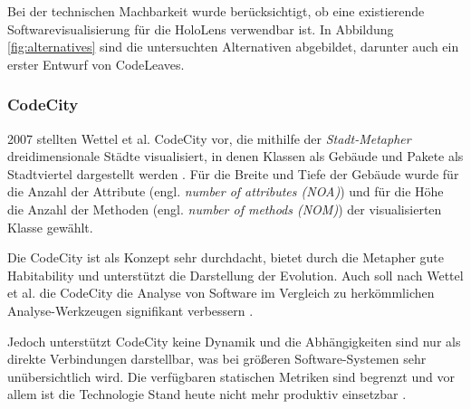 Bei der technischen Machbarkeit wurde berücksichtigt, ob eine existierende Softwarevisualisierung für die HoloLens verwendbar ist. In Abbildung \ref{fig:alternatives} sind die untersuchten Alternativen abgebildet, darunter auch ein erster Entwurf von CodeLeaves.

\subsubsection*{CodeCity}
2007 stellten Wettel et al. CodeCity vor, die mithilfe der \textit{Stadt-Metapher} dreidimensionale Städte visualisiert, in denen Klassen als Gebäude und Pakete als Stadtviertel dargestellt werden \cite{wettel2007program, wettel2008visual, wettel2011software}. Für die Breite und Tiefe der Gebäude wurde für die Anzahl der Attribute (engl. \emph{number of attributes (NOA)}) und für die Höhe die Anzahl der Methoden (engl. \emph{number of methods (NOM)}) der visualisierten Klasse gewählt.

Die CodeCity ist als Konzept sehr durchdacht, bietet durch die Metapher gute Habitability und unterstützt die Darstellung der Evolution. Auch soll nach Wettel et al. die CodeCity die Analyse von Software im Vergleich zu herkömmlichen Analyse-Werkzeugen signifikant verbessern \cite{wettel2011software}.

Jedoch unterstützt CodeCity keine Dynamik und die Abhängigkeiten sind nur als direkte Verbindungen darstellbar, was bei größeren Software-Systemen sehr unübersichtlich wird. Die verfügbaren statischen Metriken sind begrenzt und vor allem ist die Technologie Stand heute nicht mehr produktiv einsetzbar \cite{puetz2017softwarevisualisierung}.

